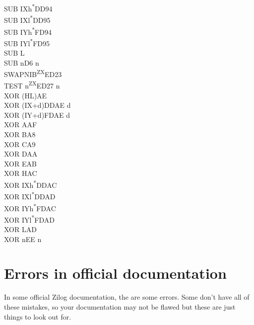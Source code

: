 \documentclass[twoside,openright,a4paper]{book}
\begin{document}
\begin{multicols}{3}
{\begin{tabbing}
	SUB IXh\textsuperscript{*}\>DD94\\
	SUB IXl\textsuperscript{*}\>DD95\\
	SUB IYh\textsuperscript{*}\>FD94\\
	SUB IYl\textsuperscript{*}\>FD95\\
	SUB L\\
	SUB n\>D6 n\\
	SWAPNIB\textsuperscript{ZX}\>ED23\\
	TEST n\textsuperscript{ZX}\>ED27 n\\
	XOR (HL)\>AE\\
	XOR (IX+d)\>DDAE d\\
	XOR (IY+d)\>FDAE d\\
	XOR A\>AF\\
	XOR B\>A8\\
	XOR C\>A9\\
	XOR D\>AA\\
	XOR E\>AB\\
	XOR H\>AC\\
	XOR IXh\textsuperscript{*}\>DDAC\\
	XOR IXl\textsuperscript{*}\>DDAD\\
	XOR IYh\textsuperscript{*}\>FDAC\\
	XOR IYl\textsuperscript{*}\>FDAD\\
	XOR L\>AD\\
	XOR n\>EE n

	\end{tabbing}
}
\end{multicols}
\normalsize


\appendix




\chapter{Errors in official documentation}


In some official Zilog documentation, the are some errors. Some don't have all of these mistakes, so your documentation may not be flawed but these are just things to look out for.
\end{document}
